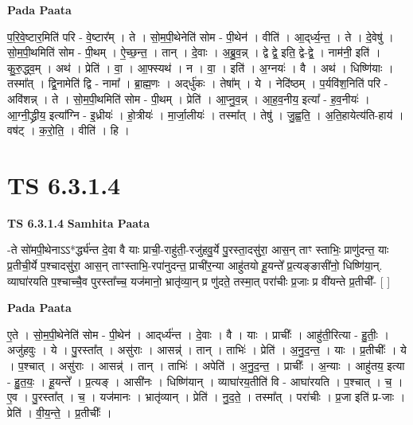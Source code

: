 \documentclass[17pt]{extarticle}
\begin{document}
\textbf{Pada Paata} \newline

प॒रि॒वे॒ष्टार॒मिति॑ परि - वे॒ष्टार᳚म् । ते । सो॒म॒पी॒थेनेति॑ सोम - पी॒थेन॑ । वीति॑ । आ॒द्‌र्ध्य॒न्त॒ । ते । दे॒वेषु॑ । सो॒म॒पी॒थमिति॑ सोम - पी॒थम् । ऐ॒च्छ॒न्त॒ । तान् । दे॒वाः । अ॒ब्रु॒व॒न्न् । द्वे द्वे॒ इति॒ द्वे-द्वे॒ । नाम॑नी॒ इति॑ । कु॒रु॒द्ध्व॒म् । अथ॑ । प्रेति॑ । वा॒ । आ॒फ्स्यथ॑ । न । वा॒ । इति॑ । अ॒ग्नयः॑ । वै । अथ॑ । धिष्णि॑याः । तस्मा᳚त् । द्वि॒नामेति॑ द्वि - नामा᳚ । ब्रा॒ह्म॒णः । अद्‌र्धु॑कः । तेषा᳚म् । ये । नेदि॑ष्ठम् । प॒र्यवि॑श॒निति॑ परि - अवि॑शन्न् । ते । सो॒म॒पी॒थमिति॑ सोम - पी॒थम् । प्रेति॑ । आ॒प्नु॒व॒न्न् । आ॒ह॒व॒नीय॒ इत्या᳚ - ह॒व॒नीयः॑ । आ॒ग्नी॒द्ध्रीय॒ इत्या᳚ग्नि - इ॒ध्रीयः॑ । हो॒त्रीयः॑ । मा॒र्जा॒लीयः॑ । तस्मा᳚त् । तेषु॑ । जु॒ह्व॒ति॒ । अ॒ति॒हायेत्य॑ति-हाय॑ । वष॑ट् । क॒रो॒ति॒ । वीति॑ । हि ।  \newline





\section{ TS 6.3.1.4 }

\textbf{TS 6.3.1.4 } \newline
\textbf{Samhita Paata} \newline

-ते सो॑मपी॒थेनाऽऽ*र्द्ध्य॑न्त दे॒वा वै याः प्राची॒-राहु॑ती॒-रजु॑हवु॒र्ये पु॒रस्ता॒दसु॑रा॒ आस॒न् ताꣳ स्ताभिः॒ प्राणु॑दन्त॒ याः प्र॒तीची॒र्ये प॒श्चादसु॑रा॒ आस॒न् ताꣳस्ताभि॒-रपा॑नुदन्त॒ प्राची॑र॒न्या आहु॑तयो हू॒यन्ते᳚ प्र॒त्यङ्ङासी॑नो॒ धिष्णि॑या॒न्. व्याघा॑रयति प॒श्चाच्चै॒व पुरस्ता᳚च्च॒ यज॑मानो॒ भ्रातृ॑व्या॒न् प्र णु॑दते॒ तस्मा॒त् परा॑चीः प्र॒जाः प्र वी॑यन्ते प्र॒तीची᳚- [  ] \newline

\textbf{Pada Paata} \newline

ए॒ते । सो॒म॒पी॒थेनेति॑ सोम - पी॒थेन॑ । आद्‌र्ध्य॑न्त । दे॒वाः । वै । याः । प्राचीः᳚ । आहु॑ती॒रित्या - हु॒तीः॒ । अजु॑हवुः । ये । पु॒रस्ता᳚त् । असु॑राः । आसन्न्॑ । तान् । ताभिः॑ । प्रेति॑ । अ॒नु॒द॒न्त॒ । याः । प्र॒तीचीः᳚ । ये । प॒श्चात् । असु॑राः । आसन्न्॑ । तान् । ताभिः॑ । अपेति॑ । अ॒नु॒द॒न्त॒ । प्राचीः᳚ । अ॒न्याः । आहु॑तय॒ इत्या - हु॒त॒यः॒ । हू॒यन्ते᳚ । प्र॒त्यङ् । आसी॑नः । धिष्णि॑यान् । व्याघा॑रय॒तीति॑ वि - आघा॑रयति । प॒श्चात् । च॒ । ए॒व । पु॒रस्ता᳚त् । च॒ । यज॑मानः । भ्रातृ॑व्यान् । प्रेति॑ । नु॒द॒ते॒ । तस्मा᳚त् । परा॑चीः । प्र॒जा इति॑ प्र-जाः । प्रेति॑ । वी॒य॒न्ते॒ । प्र॒तीचीः᳚ ।  \newline
\end{document}
